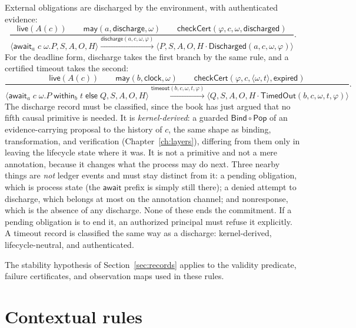 \documentclass[11pt,openany]{book}
\theoremstyle{remark}
\newcommand{\Pop}{\mathsf{Pop}}
\newcommand{\Bind}{\mathsf{Bind}}
\begin{document}
External obligations are discharged by the environment, with
authenticated evidence:
{\footnotesize
\[
\frac{\mathsf{live}(A(c))\qquad\mathsf{may}(a,\mathsf{discharge},\omega)\qquad
      \mathsf{checkCert}(\varphi,c,\omega,\mathsf{discharged})}{
\langle \mathsf{await}_a\;c\;\omega.P,S,A,O,H\rangle
\xrightarrow{\mathsf{discharge}(a,c,\omega,\varphi)}
\langle P,S,A,O,H\cdot\mathsf{Discharged}(a,c,\omega,\varphi)\rangle}.
\]
}
For the deadline form, discharge takes the first branch by the same rule,
and a certified timeout takes the second:
{\footnotesize
\[
\frac{\mathsf{live}(A(c))\qquad\mathsf{may}(b,\mathsf{clock},\omega)\qquad
      \mathsf{checkCert}(\varphi,c,\langle\omega,t\rangle,\mathsf{expired})}{
\langle \mathsf{await}_a\;c\;\omega.P\;\mathsf{within}_b\;t\;\mathsf{else}\;Q,
S,A,O,H\rangle
\xrightarrow{\mathsf{timeout}(b,c,\omega,t,\varphi)}
\langle Q,S,A,O,H\cdot\mathsf{TimedOut}(b,c,\omega,t,\varphi)\rangle}.
\]
}
The discharge record must be classified, since the book has just argued
that no fifth causal primitive is needed. It is \emph{kernel-derived}: a
guarded $\Bind\circ\Pop$ of an evidence-carrying proposal to the history of
$c$, the same shape as binding, transformation, and verification
(Chapter~\ref{ch:layers}), differing from them only in leaving the
lifecycle state where it was. It is not a primitive and not a mere
annotation, because it changes what the process may do next. Three
nearby things are \emph{not} ledger events and must stay distinct from
it: a pending obligation, which is process state (the $\mathsf{await}$
prefix is simply still there); a denied attempt to discharge, which
belongs at most on the annotation channel; and nonresponse, which is the
absence of any discharge. None of these ends the commitment. If a pending
obligation is to end it, an authorized principal must refuse it
explicitly. A timeout record is classified the same way as a discharge:
kernel-derived, lifecycle-neutral, and authenticated.

The stability hypothesis of Section~\ref{sec:records} applies to the
validity predicate, failure certificates, and observation maps used in
these rules.

\section{Contextual rules}
\end{document}
